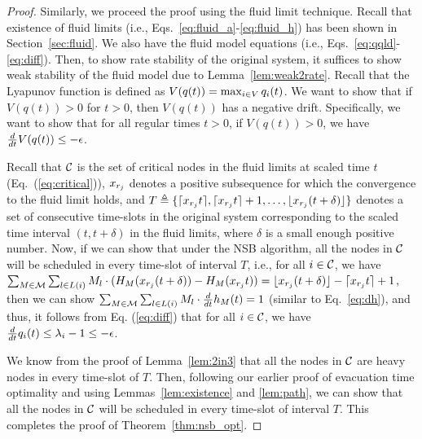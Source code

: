 \documentclass[10pt,journal,compsoc]{IEEEtran}
\begin{document}
\begin{proof}
Similarly, we proceed the proof using the fluid limit technique. 
Recall that existence of fluid limits (i.e., Eqs.~\eqref{eq:fluid_a}-\eqref{eq:fluid_h}) has been shown 
in Section~\ref{sec:fluid}. We also have the fluid model equations (i.e., Eqs.~\eqref{eq:qqld}-\eqref{eq:diff}).
Then, to show rate stability of the original system, it suffices to show weak stability of the fluid model 
due to Lemma~\ref{lem:weak2rate}. Recall that the Lyapunov function is defined as 
$V(q(t)) = \max_{i \in V} q_i(t)$.
We want to show that if $V(q(t))>0$ for $t>0$, then $V(q(t))$ has a negative drift. 
Specifically, we want to show that for all regular times $t>0$, if $V(q(t)) > 0$, we have ${\textstyle \frac{d}{dt}} V(q(t)) \le - \epsilon$.

Recall that $\mathcal{C}$ is the set of critical nodes in the fluid limits at scaled time $t$ (Eq.~(\ref{eq:critical})),
${x_{r_j}}$ denotes a positive subsequence for which the convergence to the fluid limit holds,
and $T \triangleq \{\lceil {x_{r_j}} t \rceil, \lceil {x_{r_j}} t \rceil + 1, \dots, \lfloor {x_{r_j}} (t+\delta) \rfloor\}$ denotes 
a set of consecutive time-slots in the original system corresponding to the scaled time interval $(t,t+\delta)$ 
in the fluid limits, where $\delta$ is a small enough positive number. Now, if we can show that under 
the NSB algorithm, all the nodes in $\mathcal{C}$ will be scheduled in every time-slot of interval $T$, i.e.,
for all $i \in \mathcal{C}$, we have $\sum_{M \in \mathcal{M}} \sum_{l \in L(i)} M_l \cdot (H_M({x_{r_j}} (t+\delta))-H_M({x_{r_j}} t)) 
= \lfloor {x_{r_j}} (t+\delta) \rfloor - \lceil {x_{r_j}} t \rceil + 1$, then we can show $\sum_{M \in \mathcal{M}} \sum_{l \in L(i)} M_l \cdot {\textstyle \frac{d}{dt}} h_M(t) = 1$ (similar to Eq.~\eqref{eq:dh}),
and thus, it follows from Eq. (\ref{eq:diff}) that for all $i \in \mathcal{C}$, we have ${\textstyle \frac{d}{dt}} q_i(t) \le \lambda_i - 1 \le -\epsilon$.

We know from the proof of Lemma~\ref{lem:2in3} that all the nodes in $\mathcal{C}$ are heavy nodes in 
every time-slot of $T$. Then, following our earlier proof of evacuation time optimality and using 
Lemmas~\ref{lem:existence} and \ref{lem:path}, we can show that all the nodes in $\mathcal{C}$ will be 
scheduled in every time-slot of interval $T$. This completes the proof of Theorem~\ref{thm:nsb_opt}.
\end{proof}
\end{document}
